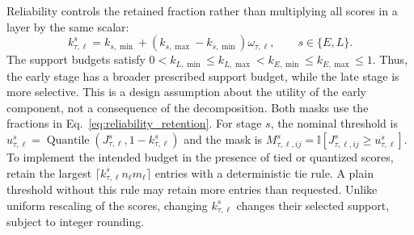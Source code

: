\documentclass[fleqn,10pt]{wlscirep}
\begin{document}
Reliability controls the retained fraction rather than multiplying all scores in a layer by the same scalar:
\begin{equation}
k_{\tau,\ell}^{s}
=k_{s,\min}+(k_{s,\max}-k_{s,\min})\omega_{\tau,\ell},
\qquad s\in\{E,L\}.
\label{eq:reliability_retention}
\end{equation}
The support budgets satisfy $0<k_{L,\min}\leq k_{L,\max}<k_{E,\min}\leq k_{E,\max}\leq1$. Thus, the early stage has a broader prescribed support budget, while the late stage is more selective. This is a design assumption about the utility of the early component, not a consequence of the decomposition. Both masks use the fractions in Eq.~\eqref{eq:reliability_retention}. For stage $s$, the nominal threshold is $u_{\tau,\ell}^{s}=\operatorname{Quantile} (J_{\tau,\ell}^{s},1-k_{\tau,\ell}^{s})$ and the mask is $M_{\tau,\ell,ij}^{s}=\mathbb{I} [J_{\tau,\ell,ij}^{s}\geq u_{\tau,\ell}^{s}]$. To implement the intended budget in the presence of tied or quantized scores, retain the largest $\lceil k_{\tau,\ell}^{s}n_{\ell}m_{\ell}\rceil$ entries with a deterministic tie rule. A plain threshold without this rule may retain more entries than requested. Unlike uniform rescaling of the scores, changing $k_{\tau,\ell}^{s}$ changes their selected support, subject to integer rounding.
\end{document}
